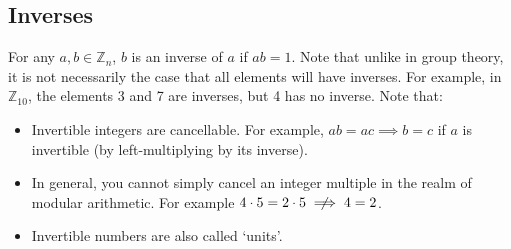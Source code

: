 \subsection{Inverses}
For any \(a, b \in \mathbb Z_n\), \(b\) is an inverse of \(a\) if \(ab=1\).
Note that unlike in group theory, it is not necessarily the case that all elements will have inverses.
For example, in \(\mathbb Z_{10}\), the elements 3 and 7 are inverses, but 4 has no inverse.
Note that:
\begin{itemize}
	\item Invertible integers are cancellable.
	      For example, \(ab=ac \implies b=c\) if \(a\) is invertible (by left-multiplying by its inverse).
	\item In general, you cannot simply cancel an integer multiple in the realm of modular arithmetic.
	      For example \(4 \cdot 5 = 2 \cdot 5 \centernot\implies 4 = 2\).
	\item Invertible numbers are also called `units'.
\end{itemize}
